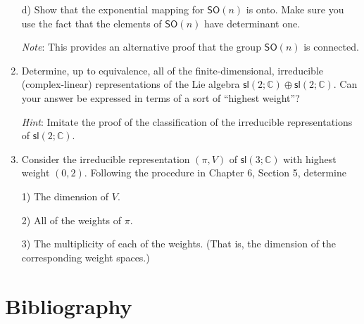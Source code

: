 \documentclass[12pt]{amsbook}
\theoremstyle{plain}
\numberwithin{equation}{chapter}
\numberwithin{theorem}{chapter}
\begin{document}
\begin{enumerate}
d) Show that the exponential mapping for $\mathsf{SO}(n)$ is onto. Make sure
you use the fact that the elements of $\mathsf{SO}(n)$ have determinant one.

\textit{Note}: This provides an alternative proof that the group
$\mathsf{SO}(n)$ is connected.

\item  Determine, up to equivalence, all of the finite-dimensional,
irreducible (complex-linear) representations of the Lie algebra $\mathsf{sl}%
(2;\mathbb{C})\oplus\mathsf{sl}(2;\mathbb{C})$. Can your answer be expressed
in terms of a sort of ``highest weight''?

\textit{Hint}: Imitate the proof of the classification of the irreducible
representations of $\mathsf{sl}(2;\mathbb{C})$.

\item  Consider the irreducible representation $\left(  \pi,V\right)  $ of
$\mathsf{sl}\left(  3;\mathbb{C}\right)  $ with highest weight $\left(
0,2\right)  $. Following the procedure in Chapter 6, Section 5, determine

1) The dimension of $V$.

2) All of the weights of $\pi$.

3) The multiplicity of each of the weights. (That is, the dimension of the
corresponding weight spaces.)
\end{enumerate}

\chapter{Bibliography}
\end{document}

